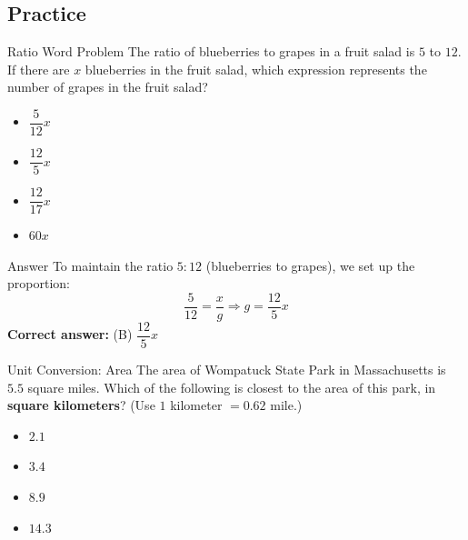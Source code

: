 \documentclass{beamer}
\begin{document}
\begin{frame}
\section{Practice}
\end{frame}



\begin{frame}{Ratio Word Problem}
The ratio of blueberries to grapes in a fruit salad is $5$ to $12$. If there are $x$ blueberries in the fruit salad, which expression represents the number of grapes in the fruit salad?
\begin{itemize}
    \item[(A)] $\dfrac{5}{12}x$
    \item[(B)] $\dfrac{12}{5}x$
    \item[(C)] $\dfrac{12}{17}x$
    \item[(D)] $60x$
\end{itemize}
\end{frame}


\begin{frame}{Answer}
To maintain the ratio $5:12$ (blueberries to grapes), we set up the proportion:
\[
\dfrac{5}{12} = \dfrac{x}{g} \Rightarrow g = \dfrac{12}{5}x
\]
\textbf{Correct answer:} (B) $\dfrac{12}{5}x$
\end{frame}

\begin{frame}{Unit Conversion: Area}
The area of Wompatuck State Park in Massachusetts is $5.5$ square miles. Which of the following is closest to the area of this park, in \textbf{square kilometers}? (Use $1$ kilometer $= 0.62$ mile.)
\begin{itemize}
    \item[(A)] $2.1$
    \item[(B)] $3.4$
    \item[(C)] $8.9$
    \item[(D)] $14.3$
\end{itemize}
\end{frame}
\end{document}
